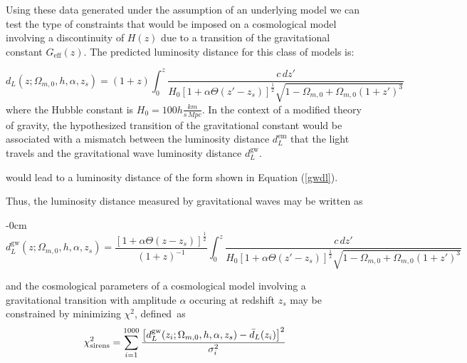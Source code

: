 \documentclass[universe,article,accept,moreauthors,pdftex]{Definitions/mdpi}
\begin{document}
Using these data generated under the assumption of an underlying \plcdm model we can test the type of constraints that would be imposed on a cosmological model involving a discontinuity of $H(z)$ due to a transition of the gravitational constant $G_{\text{eff}}(z)$. The predicted luminosity distance for this class of models is: 

\begin{equation} \label{eq:solve}
    d_{L}(z;\Omega_{m,0},h,\alpha,z_{s})=(1+z)\int_{0}^{z}\frac{c\, dz'}{H_{0}[1+\alpha \Theta(z'-z_{s})]^{\frac{1}{2}}\sqrt{1-\Omega_{m,0}+\Omega_{m,0}(1+z')^{3}}}
\end{equation}
where the Hubble constant is $H_{0}=100h\frac{km}{s\, Mpc}$. In the context of a modified theory of gravity, the hypothesized transition of the gravitational constant would be associated with a mismatch between the luminosity distance $d^{\text{em}}_{L}$ that the light travels %
and the gravitational wave luminosity distance $d_{L}^{\text{gw}}$\cite{Belgacem_2018}. 






 would lead to a  luminosity distance of the form \cite{Belgacem_2018} shown in Equation (\ref{gwdl}).
 

Thus, the luminosity distance measured by gravitational waves may be written as

\begin{adjustwidth}{-\extralength}{0cm}
\begin{equation}\label{eq:solve3}
    d_{L}^{\text{gw}}(z;\Omega_{m,0},h,\alpha,z_{s})=\frac{[1+\alpha \Theta(z-z_{s})]^{\frac{1}{2}}}{(1+z)^{-1}}\int_{0}^{z}\frac{c\,dz'}{H_{0}[1+\alpha \Theta(z'-z_{s})]^{\frac{1}{2}}\sqrt{1-\Omega_{m,0}+\Omega_{m,0}(1+z')^{3}}}
\end{equation}
\end{adjustwidth}
and the cosmological parameters of a cosmological model involving a gravitational transition with amplitude $\alpha$ occuring at redshift $z_s$ may be constrained by minimizing $\chi^{2}$, \mbox{defined as}
 \begin{equation} \label{eq:solve4}
     \chi^{2}_{\text{sirens}}=\sum^{1000}_{i=1}\frac{\big{[}d_{L}^{\text{gw}}(z_{i};\Omega_{m,0},h,\alpha,z_{s})-\bar{d}_{L}(z_{i})\big{]}^{2}}{\sigma_{i}^{2}}\end{equation} 
     
\end{document}
